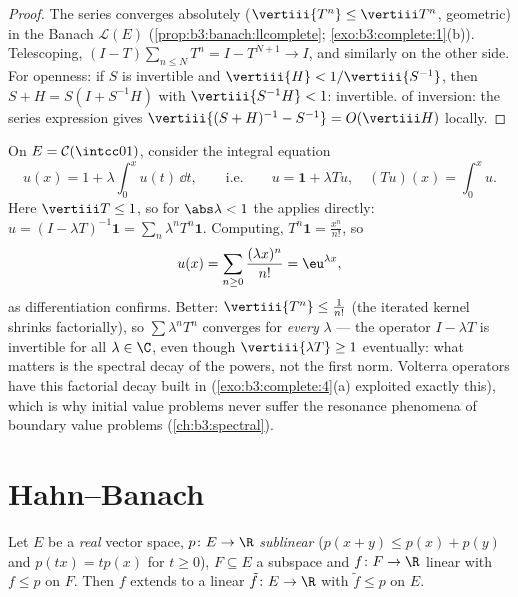 \begin{proof}
The series converges absolutely ($\vertiii{T^n} \leq \vertiii
T^n$, geometric) in the Banach $\mathcal L(E)$
(\cref{prop:b3:banach:llcomplete};
\cref{exo:b3:complete:1}(b)). Telescoping, $(I - T)\sum_{n \leq
N}T^n = I - T^{N+1} \to I$, and similarly on the other side.
For openness: if $S$ is invertible and $\vertiii{H} <
1/\vertiii{S^{-1}}$, then $S + H = S(I + S^{-1}H)$ with
$\vertiii{S^{-1}H} < 1$: invertible.  of inversion:
the series expression gives $\vertiii{(S+H)^{-1} - S^{-1}} =
O(\vertiii H)$ locally.
\end{proof}

\begin{example}
\label{ex:b3:banach:volterraexample}
On $E = \mathcal C(\intcc01)$, consider the integral equation
\[
u(x) = 1 + \lambda\int_0^xu(t)\,\dd t,
\qquad\text{i.e.}\qquad u = \mathbf 1 + \lambda Tu,
\quad (Tu)(x) = \int_0^xu .
\]
Here $\vertiii T \leq 1$, so for $\abs\lambda < 1$ the  applies directly: $u = (I - \lambda T)^{-1}\mathbf 1 =
\sum_n\lambda^nT^n\mathbf 1$. Computing, $T^n\mathbf 1 =
\frac{x^n}{n!}$, so
\[
u(x) = \sum_{n\geq0}\frac{(\lambda x)^n}{n!} =
\eu^{\lambda x} ,
\]
as differentiation confirms. Better: $\vertiii{T^n} \leq
\frac1{n!}$ (the iterated kernel shrinks factorially), so
$\sum\lambda^nT^n$ converges for \emph{every} $\lambda$ ---
the operator $I - \lambda T$ is invertible for all $\lambda
\in \C$, even though $\vertiii{\lambda T} \geq 1$ eventually:
what matters is the spectral decay of the powers, not the
first norm. Volterra operators have this factorial decay
built in (\cref{exo:b3:complete:4}(a) exploited exactly
this), which is why initial value problems never suffer the
resonance phenomena of boundary value problems
(\cref{ch:b3:spectral}).
\end{example}

\section{Hahn--Banach}

\begin{theorem}
\label{thm:b3:banach:hahnbanach}
Let $E$ be a \emph{real} vector space, $p \colon E \to \R$
\emph{sublinear} ($p(x + y) \leq p(x) + p(y)$ and $p(tx) =
tp(x)$ for $t \geq 0$), $F \subseteq E$ a subspace and $f
\colon F \to \R$ linear with $f \leq p$ on $F$. Then $f$ extends
to a linear $\tilde f \colon E \to \R$ with $\tilde f \leq p$
on $E$.
\end{theorem}

